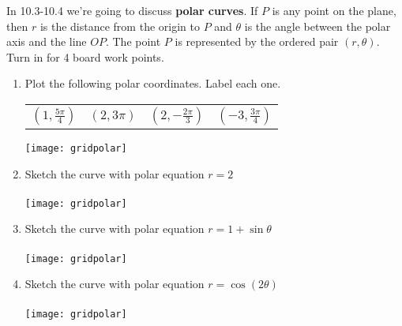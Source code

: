 \documentclass[12 pt]{article}
\begin{document}
In 10.3-10.4 we're going to discuss \textbf{polar curves}. If $P$ is any point on the plane, then $r$ is the distance from the origin to $P$ and $\theta$ is the angle between the polar axis and the line $OP$. The point $P$ is represented by the ordered pair $(r,\theta)$. Turn in for 4 board work points.\\

\begin{enumerate}

\item Plot the following polar coordinates. Label each one.


\begin{tabular}{l l l l}
 $\left( 1, \frac{5\pi}{4} \right)$ &	 $\left( 2, 3\pi \right)$ 	&  $\left( 2, -\frac{2\pi}{3} \right)$	&  $\left(-3, \frac{3\pi}{4} \right)$
\end{tabular}

\texttt{[image: gridpolar]}


\item Sketch the curve with polar equation $r=2$  \\
\\
\texttt{[image: gridpolar]}

\newpage

\item Sketch the curve with polar equation $r=1+ \sin \theta $  \\
\\
\texttt{[image: gridpolar]}


\item Sketch the curve with polar equation $r = \cos (2 \theta) $ \\
\\
\texttt{[image: gridpolar]}

\end{enumerate}
\end{document}
